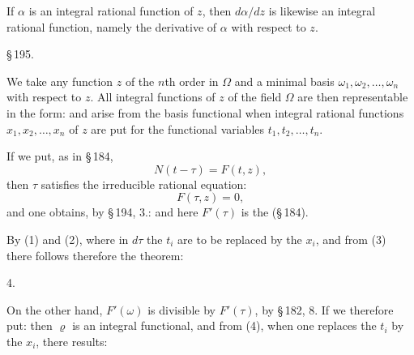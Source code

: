 
If $\alpha$ is an integral rational function of $z$, then $d\alpha/dz$ is likewise an integral rational function, namely the derivative of $\alpha$ with respect to $z$.

\begin{center}
\S\,195. \textbf{}
\end{center}

We take any function $z$ of the $n$th order in $\Omega$ and a minimal basis $\omega_1, \omega_2, \ldots, \omega_n$ with respect to $z$. All integral functions of $z$ of the field $\Omega$ are then representable in the form:
and arise from the basis functional
when integral rational functions $x_1, x_2, \ldots, x_n$ of $z$ are put for the functional variables $t_1, t_2, \ldots, t_n$.

If we put, as in \S\,184,
\[
N(t - \tau) = F(t, z),
\]
then $\tau$ satisfies the irreducible rational equation:
\[
F(\tau, z) = 0,
\]
and one obtains, by \S\,194, 3.:
and here $F'(\tau)$ is the  (\S\,184).

By (1) and (2),
where in $d\tau$ the $t_i$ are to be replaced by the $x_i$, and from (3) there follows therefore the theorem:

4. 

On the other hand, $F'(\omega)$ is divisible by $F'(\tau)$, by \S\,182, 8. If we therefore put:
then $\varrho$ is an integral functional, and from (4), when one replaces the $t_i$ by the $x_i$, there results:
